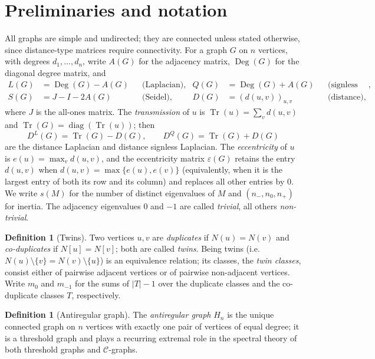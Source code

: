 \documentclass[11pt]{article}
\theoremstyle{plain}
\theoremstyle{definition}
\newtheorem{definition}[theorem]{Definition}
\theoremstyle{remark}
\DeclareMathOperator{\Tr}{Tr}
\DeclareMathOperator{\diag}{diag}
\DeclareMathOperator{\Deg}{Deg}
\begin{document}
	\section{Preliminaries and notation}
	\label{sec:prelim}
	
	All graphs are simple and undirected; they are connected unless stated otherwise, since distance-type matrices require connectivity. For a graph $G$ on $n$ vertices, with degrees $d_1,\dots,d_n$, write $A(G)$ for the adjacency matrix, $\Deg(G)$ for the diagonal degree matrix, and
	\begin{align*}
		L(G)&=\Deg(G)-A(G) &&\text{(Laplacian)}, & Q(G)&=\Deg(G)+A(G) &&\text{(signless Laplacian)},\\
		S(G)&=J-I-2A(G) &&\text{(Seidel)}, & D(G)&=(d(u,v))_{u,v} &&\text{(distance)},
	\end{align*}
	where $J$ is the all-ones matrix. The \emph{transmission} of $u$ is $\Tr(u)=\sum_vd(u,v)$ and $\Tr(G)=\diag(\Tr(u))$; then
	\[
	D^L(G)=\Tr(G)-D(G),\qquad D^Q(G)=\Tr(G)+D(G)
	\]
	are the distance Laplacian and distance signless Laplacian. The \emph{eccentricity} of $u$ is $e(u)=\max_vd(u,v)$, and the eccentricity matrix $\varepsilon(G)$ retains the entry $d(u,v)$ when $d(u,v)=\max\{e(u),e(v)\}$ (equivalently, when it is the largest entry of both its row and its column) and replaces all other entries by $0$. We write $s(M)$ for the number of distinct eigenvalues of $M$ and $(n_-,n_0,n_+)$ for inertia. The adjacency eigenvalues $0$ and $-1$ are called \emph{trivial}, all others \emph{non-trivial}.
	
	\begin{definition}[Twins]
		Two vertices $u,v$ are \emph{duplicates} if $N(u)=N(v)$ and \emph{co-duplicates} if $N[u]=N[v]$; both are called \emph{twins}. Being twins (i.e.\ $N(u)\setminus\{v\}=N(v)\setminus\{u\}$) is an equivalence relation; its classes, the \emph{twin classes}, consist either of pairwise adjacent vertices or of pairwise non-adjacent vertices. Write $m_0$ and $m_{-1}$ for the sums of $|T|-1$ over the duplicate classes and the co-duplicate classes $T$, respectively.
	\end{definition}
	
	\begin{definition}[Antiregular graph]
		The \emph{antiregular graph} $H_n$ is the unique connected graph on $n$ vertices with exactly one pair of vertices of equal degree; it is a threshold graph and plays a recurring extremal role in the spectral theory of both threshold graphs \cite{AguilarLeePiatoSchweitzer2018,AguilarFicarraShurmanSullivan2020} and $\mathcal{C}$-graphs.
	\end{definition}
	
\end{document}
